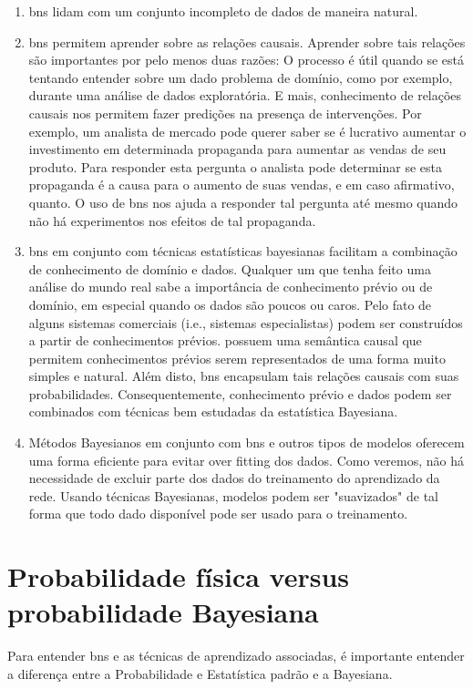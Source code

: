 \begin{enumerate}
	\item \glspl{bn} lidam com um conjunto incompleto de dados de maneira natural.

	\item \glspl{bn} permitem aprender sobre as relações causais. Aprender sobre tais relações são importantes por pelo menos duas razões: O processo é útil quando se está tentando entender sobre um dado problema de domínio, como por exemplo, durante uma análise de dados exploratória.  E mais, conhecimento de relações causais nos permitem fazer predições na presença de intervenções. Por exemplo, um analista de mercado pode querer saber se é lucrativo aumentar o investimento em determinada propaganda para aumentar as vendas de seu produto. Para responder esta pergunta o analista pode determinar se esta propaganda é a causa para o aumento de suas vendas, e em caso afirmativo, quanto. O uso de \glspl{bn} nos ajuda a responder tal pergunta até mesmo quando não há experimentos nos efeitos de tal propaganda.
	
	\item \glspl{bn} em conjunto com técnicas estatísticas bayesianas facilitam a combinação de conhecimento de domínio e dados. Qualquer um que tenha feito uma análise do mundo real sabe a importância de conhecimento prévio ou de domínio, em especial quando os dados são poucos ou caros. Pelo fato de alguns sistemas comerciais (i.e., sistemas especialistas) podem ser construídos a partir de conhecimentos prévios.  possuem uma semântica causal que permitem conhecimentos prévios serem representados de uma forma muito simples e natural. Além disto, \glspl{bn} encapsulam tais relações causais com suas probabilidades. Consequentemente, conhecimento prévio e dados podem ser combinados com técnicas bem estudadas da estatística Bayesiana.
	
	\item Métodos Bayesianos em conjunto com \glspl{bn} e outros tipos de modelos oferecem uma forma eficiente para evitar over fitting dos dados. Como veremos, não há necessidade de excluir parte dos dados do treinamento do aprendizado da rede. Usando técnicas Bayesianas, modelos podem ser "suavizados" de tal forma que todo dado disponível pode ser usado para o treinamento.

\end{enumerate}
\section{Probabilidade física versus probabilidade Bayesiana}
Para entender \glspl{bn} e as técnicas de aprendizado associadas, é importante entender a diferença entre a Probabilidade e Estatística padrão e a Bayesiana.

